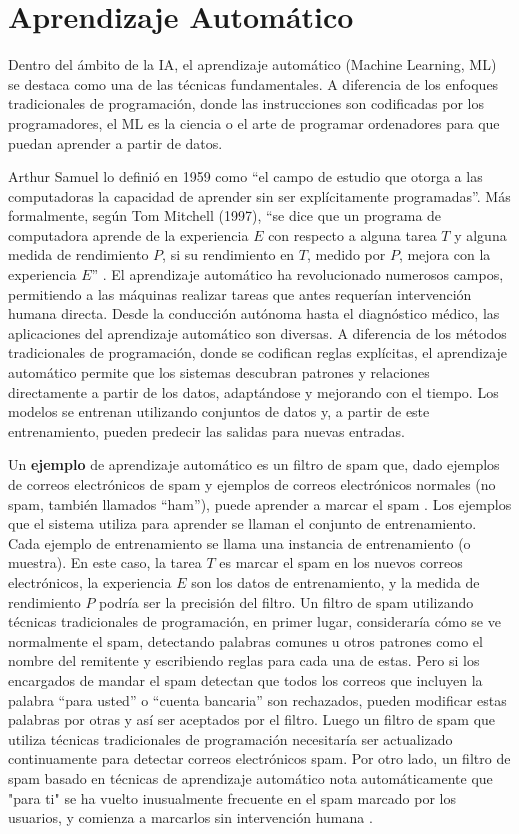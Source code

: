 \section{Aprendizaje Automático}

Dentro del ámbito de la IA, el aprendizaje automático (Machine Learning, ML) se destaca como una de las técnicas fundamentales. A diferencia de los enfoques tradicionales de programación, donde las instrucciones son codificadas por los programadores, el ML es la ciencia o el arte de programar ordenadores para que puedan aprender a partir de datos.

Arthur Samuel lo definió en 1959 como ``el campo de estudio que otorga a las computadoras la capacidad de aprender sin ser explícitamente programadas''. Más formalmente, según Tom Mitchell (1997), ``se dice que un programa de computadora aprende de la experiencia \(E\) con respecto a alguna tarea \(T\) y alguna medida de rendimiento \(P\), si su rendimiento en \(T\), medido por \(P\), mejora con la experiencia \(E\)'' \citep{geron2022hands}. El aprendizaje automático ha revolucionado numerosos campos, permitiendo a las máquinas realizar tareas que antes requerían intervención humana directa. Desde la conducción autónoma hasta el diagnóstico médico, las aplicaciones del aprendizaje automático son diversas. A diferencia de los métodos tradicionales de programación, donde se codifican reglas explícitas, el aprendizaje automático permite que los sistemas descubran patrones y relaciones directamente a partir de los datos, adaptándose y mejorando con el tiempo. Los modelos se entrenan utilizando conjuntos de datos y, a partir de este entrenamiento, pueden predecir las salidas para nuevas entradas.


Un \textbf{ejemplo} de aprendizaje automático es un filtro de spam que, dado ejemplos de correos electrónicos de spam y ejemplos de correos electrónicos normales (no spam, también llamados ``ham''), puede aprender a marcar el spam \citep{geron2022hands}. Los ejemplos que el sistema utiliza para aprender se llaman el conjunto de entrenamiento. Cada ejemplo de entrenamiento se llama una instancia de entrenamiento (o muestra). En este caso, la tarea \(T\) es marcar el spam en los nuevos correos electrónicos, la experiencia \(E\) son los datos de entrenamiento, y la medida de rendimiento \(P\) podría ser la precisión del filtro. Un filtro de spam utilizando técnicas tradicionales de programación, en primer lugar, consideraría cómo se ve normalmente el spam, detectando palabras comunes u otros patrones como el nombre del remitente y escribiendo reglas para cada una de estas. Pero si los encargados de mandar el spam detectan que todos los correos que incluyen la palabra ``para usted'' o  ``cuenta bancaria'' son rechazados, pueden modificar estas palabras por otras y así ser aceptados por el filtro. Luego un filtro de spam que utiliza técnicas tradicionales de programación necesitaría ser actualizado continuamente para detectar correos electrónicos spam. Por otro lado, un filtro de spam basado en técnicas de aprendizaje automático nota automáticamente que "para ti" se ha vuelto inusualmente frecuente en el spam marcado por los usuarios, y comienza a marcarlos sin intervención humana \citep{geron2022hands}.


